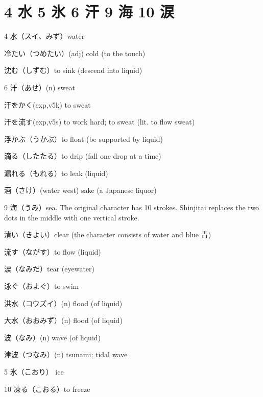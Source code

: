 \section{4 水 5 氷 6 汗 9 海 10 涙}

4 水（スイ、みず）water

冷たい（つめたい）(adj) cold (to the touch)

沈む（しずむ）to sink (descend into liquid)

6 汗（あせ）(n) sweat

汗をかく(exp,v5k) to sweat

汗を流す(exp,v5s) to work hard; to sweat (lit. to flow sweat)

浮かぶ（うかぶ）to float (be supported by liquid)

滴る（したたる）to drip (fall one drop at a time)

漏れる（もれる）to leak (liquid)

酒（さけ）(water west) sake (a Japanese liquor)

9 海（うみ）sea.
The original character has 10 strokes.
Shinjitai replaces the two dots in the middle
with one vertical stroke.

清い（きよい）clear (the character consists of water and blue 青)

流す（ながす）to flow (liquid)

涙（なみだ）tear (eyewater)

泳ぐ（およぐ）to swim

洪水（コウズイ）(n) flood (of liquid)

大水（おおみず）(n) flood (of liquid)

波（なみ）(n) wave (of liquid)

津波（つなみ）(n) tsunami; tidal wave

5 氷（こおり） ice

10 凍る（こおる）to freeze
